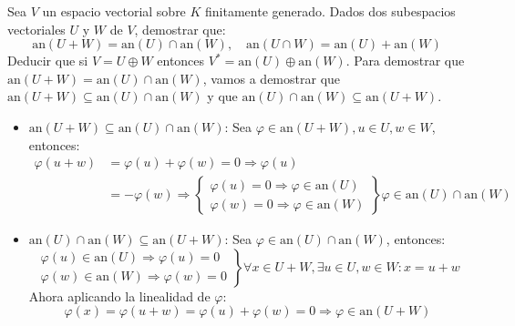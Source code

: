 \begin{ejercicio}
	Sea $V$ un espacio vectorial sobre $K$ finitamente generado. Dados dos subespacios vectoriales $U$ y $W$
	de $V$, demostrar que:
	\begin{equation*}
		\text{an}(U+W) = \text{an}(U) \cap \text{an}(W), \quad \text{an}(U \cap W) = \text{an}(U) + \text{an}(W)
	\end{equation*}
	Deducir que si $V=U \oplus W$ entonces $V^{*} = \text{an}(U) \oplus \text{an}(W)$.
	Para demostrar que $\text{an}(U+W) = \text{an}(U) \cap \text{an}(W)$, vamos a demostrar que $\text{an}(U+W) \subseteq \text{an}(U) \cap \text{an}(W)$
	y que $\text{an}(U) \cap \text{an}(W) \subseteq \text{an}(U+W)$.
	\begin{itemize}
		\item $\text{an}(U+W) \subseteq \text{an}(U) \cap \text{an}(W)$: Sea $\varphi \in \text{an}(U+W), u \in U, w \in W$, entonces:
		      \begin{align*}
			      \varphi(u+w) &= \varphi(u) + \varphi(w) = 0 \Rightarrow \varphi(u) \\&= -\varphi(w) \Rightarrow  \left\{\begin{array}{cc}
				      \varphi(u) = 0 \Rightarrow \varphi \in \text{an}(U) \\
				      \varphi(w) = 0 \Rightarrow \varphi \in \text{an}(W)
			      \end{array} \right\} \varphi \in \text{an}(U) \cap \text{an}(W)
		      \end{align*}
		\item $\text{an}(U) \cap \text{an}(W) \subseteq \text{an}(U+W)$: Sea $\varphi \in \text{an}(U) \cap \text{an}(W)$, entonces:
		      \begin{equation*}\left.
			      \begin{array}{cc}
				      \varphi(u) \in \text{an}(U) \Rightarrow \varphi(u) = 0 \\
				      \varphi(w) \in \text{an}(W) \Rightarrow \varphi(w) = 0
			      \end{array} \right\} \forall x \in U+W, \exists u \in U, w \in W : x = u+w
		      \end{equation*}
		      Ahora aplicando la linealidad de $\varphi$:
		      \begin{equation*}
			      \varphi(x) = \varphi(u+w) = \varphi(u) + \varphi(w) = 0 \Rightarrow \varphi \in \text{an}(U+W)
		      \end{equation*}
	\end{itemize}
\end{ejercicio}

